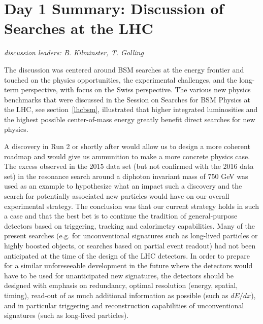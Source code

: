 \section*{Day 1 Summary: Discussion of Searches at the LHC}\label{discussionsearches}{\it discussion leaders: B. Kilminster, T. Golling}


\noindent The discussion was centered around BSM searches at the energy frontier and touched on the physics opportunities, the experimental challenges, and the long-term perspective, with focus on the Swiss perspective.
The various new physics benchmarks that were discussed in the Session on Searches for BSM Physics at the LHC, see section~\ref{lhcbsm}, illustrated that higher integrated luminosities and the highest possible 
center-of-mass energy greatly benefit direct searches for new physics.
\medskip

\noindent  A discovery in Run 2 or shortly after would allow us to design a more coherent roadmap and would give us ammunition to make a more concrete physics case.  The excess observed in the 2015 data set (but not confirmed with the 2016 data set) in the resonance search around a diphoton invariant mass of 750 GeV was used as an example to hypothesize what an impact such a discovery and the search for potentially associated new particles would have on our overall experimental strategy.  The conclusion was that our current strategy holds in such a case and that the best bet is to continue the tradition of general-purpose detectors based on triggering, tracking and calorimetry capabilities.  Many of the present searches (e.g. for unconventional signatures such as long-lived particles or highly boosted objects, or searches based on partial event readout) had not been anticipated at the time of the design of the LHC detectors.  In order to prepare for a similar unforeseeable development in the future where the detectors would have to be used for unanticipated new signatures, the detectors should be designed with emphasis on redundancy, optimal resolution (energy, spatial, timing), read-out of as much additional information as possible (such as $dE/dx$), and in particular triggering and reconstruction capabilities of unconventional signatures (such as long-lived particles).
\medskip

